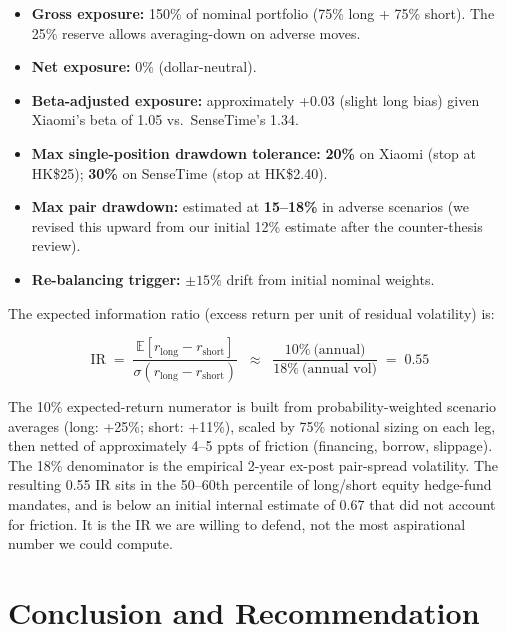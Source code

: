 \documentclass[11pt,a4paper]{article}
\begin{document}
\begin{itemize}
\item \textbf{Gross exposure:} 150\% of nominal portfolio (75\% long + 75\% short). The 25\% reserve allows averaging-down on adverse moves.
\item \textbf{Net exposure:} 0\% (dollar-neutral).
\item \textbf{Beta-adjusted exposure:} approximately +0.03 (slight long bias) given Xiaomi's beta of 1.05 vs.\ SenseTime's 1.34.
\item \textbf{Max single-position drawdown tolerance:} \textbf{20\%} on Xiaomi (stop at HK\$25); \textbf{30\%} on SenseTime (stop at HK\$2.40).
\item \textbf{Max pair drawdown:} estimated at \textbf{15--18\%} in adverse scenarios (we revised this upward from our initial 12\% estimate after the counter-thesis review).
\item \textbf{Re-balancing trigger:} $\pm 15\%$ drift from initial nominal weights.
\end{itemize}

The expected information ratio (excess return per unit of residual volatility) is:

\begin{equation}
\text{IR} \;=\; \frac{\mathbb{E}[r_{\text{long}} - r_{\text{short}}]}{\sigma(r_{\text{long}} - r_{\text{short}})} \;\;\approx\;\; \frac{10\%~\text{(annual)}}{18\%~\text{(annual vol)}} \;=\; \mathbf{0.55}
\label{eq:ir}
\end{equation}

\noindent The 10\% expected-return numerator is built from probability-weighted scenario averages (long: +25\%; short: +11\%), scaled by 75\% notional sizing on each leg, then netted of approximately 4--5 ppts of friction (financing, borrow, slippage). The 18\% denominator is the empirical 2-year ex-post pair-spread volatility. The resulting 0.55 IR sits in the 50--60th percentile of long/short equity hedge-fund mandates, and is below an initial internal estimate of 0.67 that did not account for friction. It is the IR we are willing to defend, not the most aspirational number we could compute.

\newpage
\section{Conclusion and Recommendation}
\end{document}
